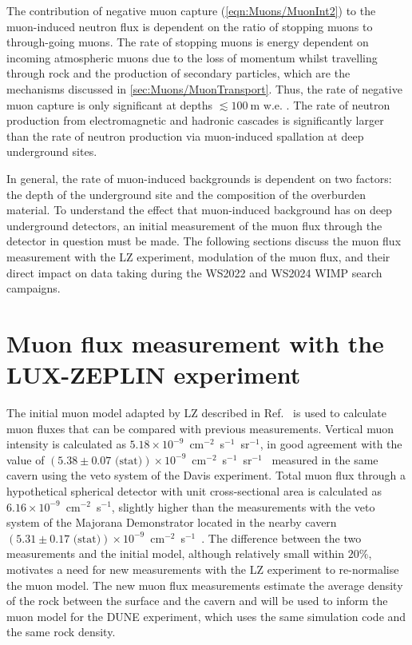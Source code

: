 The contribution of negative muon capture (\autoref{eqn:Muons/MuonInt2}) to the muon-induced neutron flux is dependent on the ratio of stopping muons to through-going muons. The rate of stopping muons is energy dependent on incoming atmospheric muons due to the loss of momentum whilst travelling through rock and the production of secondary particles, which are the mechanisms discussed in \autoref{sec:Muons/MuonTransport}. Thus, the rate of negative muon capture is only significant at depths $\lesssim100~\text{m w.e.}$ \cite{Gaisser_Engel_Resconi_2016}. The rate of neutron production from electromagnetic and hadronic cascades is significantly larger than the rate of neutron production via muon-induced spallation at deep underground sites.

In general, the rate of muon-induced backgrounds is dependent on two factors: the depth of the underground site and the composition of the overburden material. To understand the effect that muon-induced background has on deep underground detectors, an initial measurement of the muon flux through the detector in question must be made. The following sections discuss the muon flux measurement with the LZ experiment, modulation of the muon flux, and their direct impact on data taking during the WS2022 and WS2024 WIMP search campaigns.  

\section{Muon flux measurement with the LUX-ZEPLIN experiment}\label{sec:Muons/MuonFluxMeasurementWithLZ}
The initial muon model adapted by LZ described in Ref.~\cite{LZ_SIMS} is used to calculate muon fluxes that can be compared with previous measurements. Vertical muon intensity is calculated as $5.18\times10^{-9}$~cm$^{-2}$~s$^{-1}$~sr$^{-1}$, in good agreement with the value of $(5.38\pm0.07\text{ (stat)})\times10^{-9}$~cm$^{-2}$~s$^{-1}$~sr$^{-1}$~\cite{Cherry} measured in the same cavern using the veto system of the Davis experiment. Total muon flux through a hypothetical spherical detector with unit cross-sectional area is calculated as $6.16\times10^{-9}$~cm$^{-2}$~s$^{-1}$, slightly higher than the measurements with the veto system of the Majorana Demonstrator located in the nearby cavern $(5.31\pm0.17 \text{ (stat)})\times10^{-9}$~cm$^{-2}$~s$^{-1}$~\cite{majorana}.
The difference between the two measurements and the initial model, although relatively small within $20\%$, motivates a need for new measurements with the LZ experiment to re-normalise the muon model. The new muon flux measurements estimate the average density of the rock between the surface and the cavern and will be used to inform the muon model for the DUNE experiment\cite{DUNE}, which uses the same simulation code and the same rock density.


